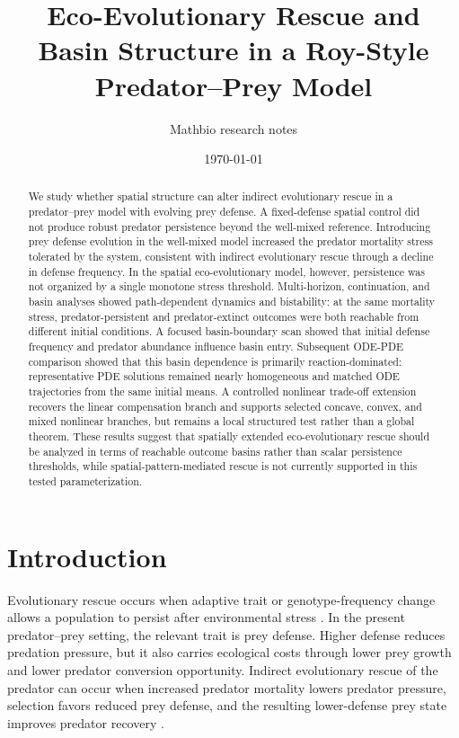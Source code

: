 \documentclass[11pt]{article}
\title{Eco-Evolutionary Rescue and Basin Structure in a Roy-Style Predator--Prey Model}
\author{Mathbio research notes}
\date{\today}
\begin{document}
\maketitle

\begin{abstract}
We study whether spatial structure can alter indirect evolutionary rescue in a predator--prey model with evolving prey defense. A fixed-defense spatial control did not produce robust predator persistence beyond the well-mixed reference. Introducing prey defense evolution in the well-mixed model increased the predator mortality stress tolerated by the system, consistent with indirect evolutionary rescue through a decline in defense frequency. In the spatial eco-evolutionary model, however, persistence was not organized by a single monotone stress threshold. Multi-horizon, continuation, and basin analyses showed path-dependent dynamics and bistability: at the same mortality stress, predator-persistent and predator-extinct outcomes were both reachable from different initial conditions. A focused basin-boundary scan showed that initial defense frequency and predator abundance influence basin entry. Subsequent ODE-PDE comparison showed that this basin dependence is primarily reaction-dominated: representative PDE solutions remained nearly homogeneous and matched ODE trajectories from the same initial means. A controlled nonlinear trade-off extension recovers the linear compensation branch and supports selected concave, convex, and mixed nonlinear branches, but remains a local structured test rather than a global theorem. These results suggest that spatially extended eco-evolutionary rescue should be analyzed in terms of reachable outcome basins rather than scalar persistence thresholds, while spatial-pattern-mediated rescue is not currently supported in this tested parameterization.
\end{abstract}

\section{Introduction}

Evolutionary rescue occurs when adaptive trait or genotype-frequency change allows a population to persist after environmental stress \citep{GomulkiewiczHolt1995,BellGonzalez2009,Bell2017}. In the present predator--prey setting, the relevant trait is prey defense. Higher defense reduces predation pressure, but it also carries ecological costs through lower prey growth and lower predator conversion opportunity. Indirect evolutionary rescue of the predator can occur when increased predator mortality lowers predator pressure, selection favors reduced prey defense, and the resulting lower-defense prey state improves predator recovery \citep{YamamichiMiner2015}.
\end{document}
